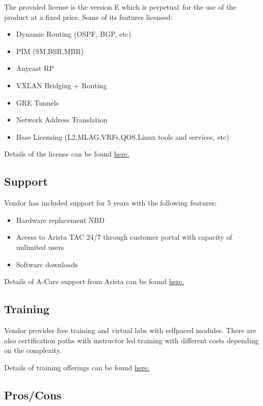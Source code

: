 The provided license is the version E which is perpetual for the use of the product at a fixed price. Some of its features licensed:

\begin{itemize}
  \item Dynamic Routing (OSPF, BGP, etc)
  \item PIM (SM,BSR,MBR)
  \item Anycast RP
  \item VXLAN Bridging + Routing
  \item GRE Tunnels
  \item Network Address Translation
  \item Base Licensing (L2,MLAG,VRFs,QOS,Linux tools and services, etc)
\end{itemize}

Details of the license can be found \href{https://www.arista.com/en/support/product-documentation/eos-feature-licensing}{here.}

\subsection{Support}

Vendor has included support for 5 years with the following features:
\begin{itemize}
  \item Hardware replacement NBD
  \item Access to Arista TAC 24/7 through customer portal with capacity of unlimited users
  \item Software downloads
\end{itemize}

Details of A-Care support from Arista can be found \href{https://www.arista.com/assets/data/pdf/A-CareServicesOverview.pdf}{here.}

\subsection{Training}

Vendor provides free training and virtual labs with selfpaced modules. There are also certification paths with instructor led training with different costs depending on the complexity.

Details of training offerings can be found \href{https://www.arista.com/en/support/hands-on-training}{here.}

\subsection{Pros/Cons}

